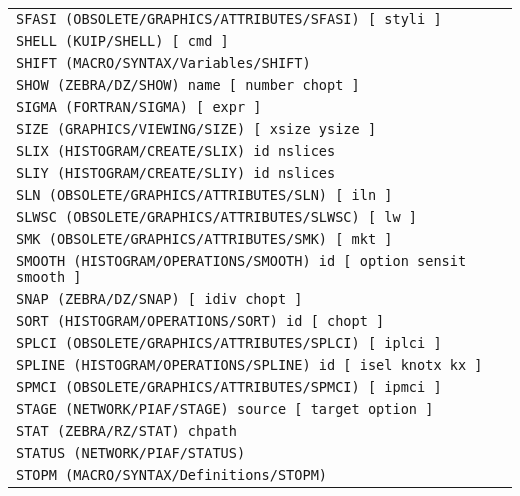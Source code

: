 \begin{longtable}{|>{\footnotesize\tt}lr|}
SFASI (OBSOLETE/GRAPHICS/ATTRIBUTES/SFASI)  [ styli ] & \pageref{ref:OBSOLETE/GRAPHICS/ATTRIBUTES/SFASI}\\ 
SHELL (KUIP/SHELL)  [ cmd ] & \pageref{ref:KUIP/SHELL}\\ 
SHIFT (MACRO/SYNTAX/Variables/SHIFT)  & \pageref{ref:MACRO/SYNTAX/Variables/SHIFT}\\ 
SHOW (ZEBRA/DZ/SHOW)  name [ number chopt ] & \pageref{ref:ZEBRA/DZ/SHOW}\\ 
SIGMA (FORTRAN/SIGMA)  [ expr ] & \pageref{ref:FORTRAN/SIGMA}\\ 
SIZE (GRAPHICS/VIEWING/SIZE)  [ xsize ysize ] & \pageref{ref:GRAPHICS/VIEWING/SIZE}\\ 
SLIX (HISTOGRAM/CREATE/SLIX)  id nslices & \pageref{ref:HISTOGRAM/CREATE/SLIX}\\ 
SLIY (HISTOGRAM/CREATE/SLIY)  id nslices & \pageref{ref:HISTOGRAM/CREATE/SLIY}\\ 
SLN (OBSOLETE/GRAPHICS/ATTRIBUTES/SLN)  [ iln ] & \pageref{ref:OBSOLETE/GRAPHICS/ATTRIBUTES/SLN}\\ 
SLWSC (OBSOLETE/GRAPHICS/ATTRIBUTES/SLWSC)  [ lw ] & \pageref{ref:OBSOLETE/GRAPHICS/ATTRIBUTES/SLWSC}\\ 
SMK (OBSOLETE/GRAPHICS/ATTRIBUTES/SMK)  [ mkt ] & \pageref{ref:OBSOLETE/GRAPHICS/ATTRIBUTES/SMK}\\ 
SMOOTH (HISTOGRAM/OPERATIONS/SMOOTH)  id [ option sensit smooth ] & \pageref{ref:HISTOGRAM/OPERATIONS/SMOOTH}\\ 
SNAP (ZEBRA/DZ/SNAP)  [ idiv chopt ] & \pageref{ref:ZEBRA/DZ/SNAP}\\ 
SORT (HISTOGRAM/OPERATIONS/SORT)  id [ chopt ] & \pageref{ref:HISTOGRAM/OPERATIONS/SORT}\\ 
SPLCI (OBSOLETE/GRAPHICS/ATTRIBUTES/SPLCI)  [ iplci ] & \pageref{ref:OBSOLETE/GRAPHICS/ATTRIBUTES/SPLCI}\\ 
SPLINE (HISTOGRAM/OPERATIONS/SPLINE)  id [ isel knotx kx ] & \pageref{ref:HISTOGRAM/OPERATIONS/SPLINE}\\ 
SPMCI (OBSOLETE/GRAPHICS/ATTRIBUTES/SPMCI)  [ ipmci ] & \pageref{ref:OBSOLETE/GRAPHICS/ATTRIBUTES/SPMCI}\\ 
STAGE (NETWORK/PIAF/STAGE)  source [ target option ] & \pageref{ref:NETWORK/PIAF/STAGE}\\ 
STAT (ZEBRA/RZ/STAT)  chpath & \pageref{ref:ZEBRA/RZ/STAT}\\ 
STATUS (NETWORK/PIAF/STATUS)  & \pageref{ref:NETWORK/PIAF/STATUS}\\ 
STOPM (MACRO/SYNTAX/Definitions/STOPM)  & \pageref{ref:MACRO/SYNTAX/Definitions/STOPM}\\ 

\end{longtable}
